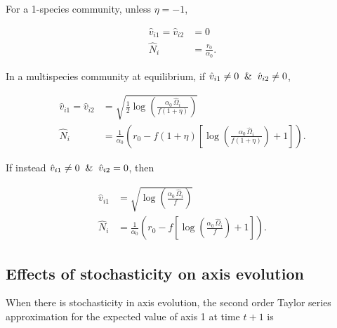 For a 1-species community, unless $\eta = -1$,

\begin{equation}
\label{eq:2-axis-1spp-solns}
\begin{split}
    \hat{v}_{i1} = \hat{v}_{i2} &= 0 \\
    \hat{N}_i &= \frac{r_0}{\alpha_0}
    \text{.}
\end{split}
\end{equation}

In a multispecies community at equilibrium, 
if $\hat{v}_{i1} \ne 0 \And \hat{v}_{i2} \ne 0$,

\begin{equation}
\label{eq:2-axis-sub-solns}
\begin{split}
    \hat{v}_{i1} = \hat{v}_{i2} &= \sqrt{\frac{1}{2} \log \left( 
        \frac{\alpha_0 \, \hat{\Omega}_i}{f (1 + \eta)}  \right)} \\
    \hat{N}_i &= \frac{1}{\alpha_0} \left(
        r_0 - f (1 + \eta) \left[
            \log\left( \frac{\alpha_0 \, \hat{\Omega}_i }{f (1 + \eta)}
            \right) + 1 
        \right]
    \right)
    \text{.}
\end{split}
\end{equation}

If instead $\hat{v}_{i1} \ne 0 \And \hat{v}_{i2} = 0$, then 

\begin{equation}
\label{eq:2-axis-super-solns}
\begin{split}
    \hat{v}_{i1} &= \sqrt{\log \left( \frac{\alpha_0 \, \hat{\Omega}_i}{f} 
        \right)} \\
    \hat{N}_i &= \frac{1}{\alpha_0} \left(
        r_0 - f \left[
            \log\left( \frac{\alpha_0 \, \hat{\Omega}_i }{f}
            \right) + 1 
        \right]
    \right)
    \text{.}
\end{split}
\end{equation}



\subsection*{Effects of stochasticity on axis evolution}

When there is stochasticity in axis evolution,
the second order Taylor series approximation for the expected
value of axis 1 at time $t+1$ is

